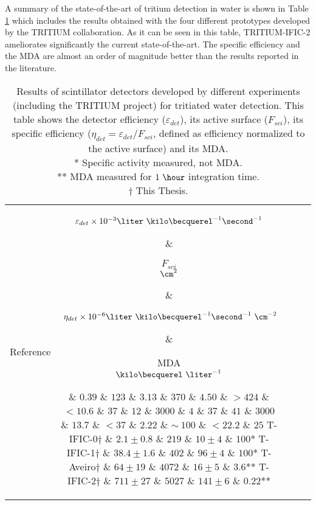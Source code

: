 \begin{enumerate}
A summary of the state-of-the-art of tritium detection in water is shown in Table \ref{tab:ComparisonResultsTritium} which includes the results obtained with the four different prototypes developed by the TRITIUM collaboration. As it can be seen in this table, TRITIUM-IFIC-2 ameliorates significantly the current state-of-the-art. The specific efficiency and the MDA are almost an order of magnitude better than the results reported in the literature.

\begin{table}[htbp]
\centering{}%
\begin{tabular}{lcrcc}
\toprule 
Reference & \parbox{5em}{$\varepsilon_{det}\times10^{-3}\\\liter~\kilo\becquerel^{-1}\second^{-1}$}  & \parbox{3.5em}{\raggedleft $F_{sci}$\\ $\cm^2$}  & \parbox{6.5em}{$~\eta_{det}\times 10^{-6}\\\liter~\kilo\becquerel^{-1}\second^{-1}~\cm^{-2}$} &  \parbox{3.5em}{MDA\\$\kilo\becquerel~\liter^{-1}$} \tabularnewline
\midrule
\midrule 
\cite{Muramatsu} & $0.39$ & $123$ & $3.13$ & $370$ \tabularnewline
\cite{Moghissi} & $4.50$ & $>424$ & $<10.6$ & $37$ \tabularnewline
\cite{Osborne} & $12$ & $3000$ & $4$ & $37$ \tabularnewline
\cite{Ratnakaran} & $41$ & $3000$ & $13.7$ & $<37$ \tabularnewline
\cite{Hofstetter1} & $2.22$ & $\sim~100$ & $<22.2$ & $25$ \tabularnewline
T-IFIC-0$\dagger$ & $2.1 \pm 0.8$ & $219$ & $10 \pm 4$ & $100$* \tabularnewline
T-IFIC-1$\dagger$ & $38.4 \pm 1.6$ & $402$ & $96 \pm 4$ & $100$* \tabularnewline
T-Aveiro$\dagger$ & $64 \pm 19$ & $4072$ & $16 \pm 5$ & $3.6$** \tabularnewline
T-IFIC-2$\dagger$ & $711 \pm 27$ & $5027$ & $141 \pm 6$ & $0.22$** \tabularnewline
\bottomrule
\end{tabular}
\caption{Results of scintillator detectors developed by different experiments (including the TRITIUM project) for tritiated water detection. This table shows the detector efficiency ($\varepsilon_{det}$), its active surface ($F_{sci}$), its specific efficiency ($\eta_{det}=\varepsilon_{det}/F_{sci}$, defined as efficiency normalized to the active surface) and its MDA.\\
* Specific activity measured, not MDA.\\ 
** MDA measured for $1~\hour$ integration time.\\
$\dagger$ This Thesis.}
\label{tab:ComparisonResultsTritium}
\end{table}


\end{enumerate}
